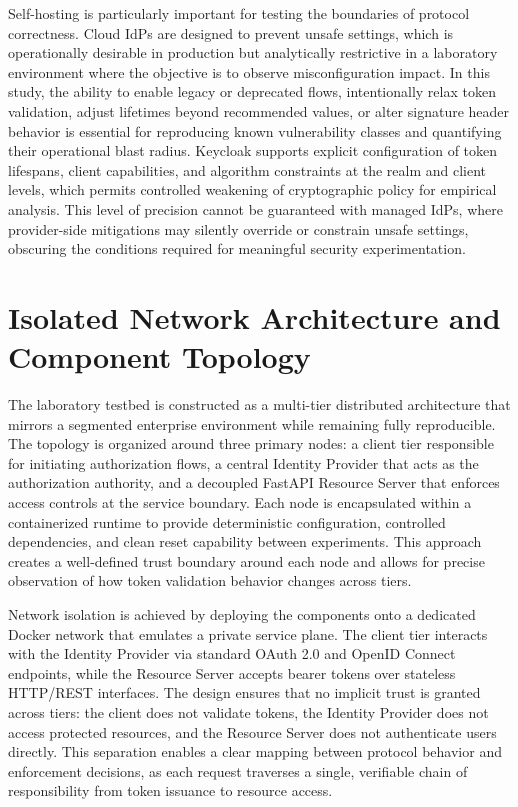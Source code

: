 \documentclass[11pt,a4paper]{report}
\begin{document}
Self-hosting is particularly important for testing the boundaries of protocol correctness. Cloud IdPs are designed to prevent unsafe settings, which is operationally desirable in production but analytically restrictive in a laboratory environment where the objective is to observe misconfiguration impact. In this study, the ability to enable legacy or deprecated flows, intentionally relax token validation, adjust lifetimes beyond recommended values, or alter signature header behavior is essential for reproducing known vulnerability classes and quantifying their operational blast radius. Keycloak supports explicit configuration of token lifespans, client capabilities, and algorithm constraints at the realm and client levels, which permits controlled weakening of cryptographic policy for empirical analysis. This level of precision cannot be guaranteed with managed IdPs, where provider-side mitigations may silently override or constrain unsafe settings, obscuring the conditions required for meaningful security experimentation.

\section{Isolated Network Architecture and Component Topology}
\label{sec:isolation-topology}
The laboratory testbed is constructed as a multi-tier distributed architecture that mirrors a segmented enterprise environment while remaining fully reproducible. The topology is organized around three primary nodes: a client tier responsible for initiating authorization flows, a central Identity Provider that acts as the authorization authority, and a decoupled FastAPI Resource Server that enforces access controls at the service boundary. Each node is encapsulated within a containerized runtime to provide deterministic configuration, controlled dependencies, and clean reset capability between experiments. This approach creates a well-defined trust boundary around each node and allows for precise observation of how token validation behavior changes across tiers.

Network isolation is achieved by deploying the components onto a dedicated Docker network that emulates a private service plane. The client tier interacts with the Identity Provider via standard OAuth 2.0 and OpenID Connect endpoints, while the Resource Server accepts bearer tokens over stateless HTTP/REST interfaces. The design ensures that no implicit trust is granted across tiers: the client does not validate tokens, the Identity Provider does not access protected resources, and the Resource Server does not authenticate users directly. This separation enables a clear mapping between protocol behavior and enforcement decisions, as each request traverses a single, verifiable chain of responsibility from token issuance to resource access.
\end{document}
